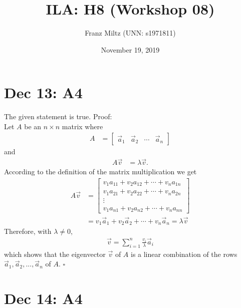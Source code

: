 \documentclass{article}
\title{ILA: H8 (Workshop 08)}
\author{Franz Miltz (UNN: s1971811)}
\date{November 19, 2019}
\begin{document}
\maketitle
\section*{Dec 13: A4}
The given statement is true. Proof:\\
Let $A$ be an $n\times n$ matrix where
\begin{align*}
    A&=\begin{bmatrix}
        \vec a_1&\vec a_2&\cdots&\vec a_n
    \end{bmatrix}
\end{align*}
and
\begin{align*}
    A\vec v &= \lambda\vec v.
\end{align*}
According to the definition of the matrix multiplication we get
\begin{align*}
    A\vec v &= \begin{bmatrix}
        v_1a_{11} + v_2a_{12} + \cdots + v_na_{1n}\\
        v_1a_{21} + v_2a_{22} + \cdots + v_na_{2n}\\
        \vdots\\
        v_1a_{n1} + v_2a_{n2} + \cdots + v_na_{nn}
    \end{bmatrix}\\
    &= v_1\vec a_1 + v_2\vec a_2 + \cdots + v_n\vec a_n = \lambda \vec v
\end{align*}
Therefore, with $\lambda\not=0$,
\begin{align*}
    \vec v = \sum_{i=1}^n \frac{v_i}{\lambda} \vec a_i
\end{align*}
which shows that the eigenvector $\vec v$ of $A$ is a linear combination of the rows $\vec a_1, \vec a_2, ..., \vec a_n$ of $A$. $\square$
\section*{Dec 14: A4}
\end{document}
